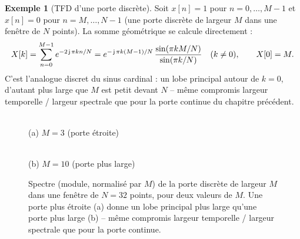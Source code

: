 \documentclass[a4paper,11pt]{article}
\theoremstyle{definition}
\newtheorem{exemple}{Exemple}[section]
\begin{document}
\begin{exemple}[TFD d'une porte discrète]
    Soit $x[n]=1$ pour $n=0,\dots,M-1$ et $x[n]=0$ pour
    $n=M,\dots,N-1$ (une porte discrète de largeur $M$ dans une fenêtre
    de $N$ points). La somme géométrique se calcule directement :
    $$
        X[k] = \sum_{n=0}^{M-1} e^{-2\operatorname{\mathsf{j}}\pi kn/N}
             = e^{-\operatorname{\mathsf{j}}\pi k(M-1)/N}\,\frac{\sin(\pi kM/N)}{\sin(\pi k/N)}
             \quad (k\neq0), \qquad X[0]=M.
    $$
    C'est l'analogue discret du sinus cardinal : un lobe principal
    autour de $k=0$, d'autant plus large que $M$ est petit devant $N$ --
    même compromis largeur temporelle / largeur spectrale que pour la
    porte continue du chapitre précédent.
\end{exemple}

\begin{figure}[h]
    \centering
    \begin{minipage}{0.48\linewidth}
        \centering
        \\[0.3em] \small (a) $M=3$ (porte étroite)
    \end{minipage}
    \hfill
    \begin{minipage}{0.48\linewidth}
        \centering
        \\[0.3em] \small (b) $M=10$ (porte plus large)
    \end{minipage}
    \caption{Spectre (module, normalisé par $M$) de la porte discrète de largeur $M$ dans une fenêtre de $N=32$ points, pour deux valeurs de $M$. Une porte plus étroite (a) donne un lobe principal plus large qu'une porte plus large (b) -- même compromis largeur temporelle / largeur spectrale que pour la porte continue.}
    \label{fig:spectre-porte-discrete}
\end{figure}
\end{document}
